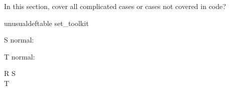 \documentclass{article}
\begin{document}
In this section, cover all complicated cases or cases not covered in code?
\begin{zsection}
\SECTION unusualdeftable \parents set\_toolkit
\end{zsection}


\begin{zed}
   [X]
\end{zed}

\begin{schema}{S}
   normal: \nat
\end{schema}

\begin{schema}{T}
   normal: \nat %
\end{schema}

\begin{schema}{R}
   S \\
   T
\end{schema}




\end{document}
